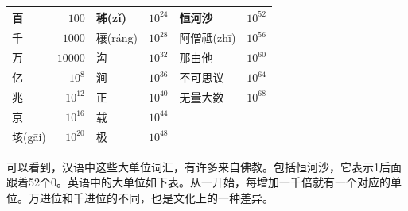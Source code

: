 \documentclass[b5paper]{ctexart}
\begin{document}
\begin{center}
\begin{tabular}{|l|r|l|r|l|r|}
\hline
百            & $100$      & 秭(z\v{i})    & $10^{24}$ &  \textbf{恒河沙}  & $10^{52}$ \\
\hline
千            & $1000$     & 穰(r\'{a}ng)  & $10^{28}$ & 阿僧祗(zh\={i})  & $10^{56}$ \\
\hline
万            & $10000$    & 沟            & $10^{32}$ & 那由他        & $10^{60}$  \\
\hline
亿            & $10^8$     & 涧            & $10^{36}$ &  不可思议      & $10^{64}$ \\
\hline
兆            & $10^{12}$  & 正            & $10^{40}$ &  无量大数      & $10^{68}$ \\
\hline
京            & $10^{16}$  & 载            & $10^{44}$ &               & \\
\hline
垓(g\={a}i)   & $10^{20}$  & 极            & $10^{48}$ &               & \\
\hline
\end{tabular}
\end{center}

可以看到，汉语中这些大单位词汇，有许多来自佛教。包括恒河沙，它表示1后面跟着52个0。英语中的大单位如下表。从一开始，每增加一千倍就有一个对应的单位。万进位和千进位的不同，也是文化上的一种差异。
\end{document}
